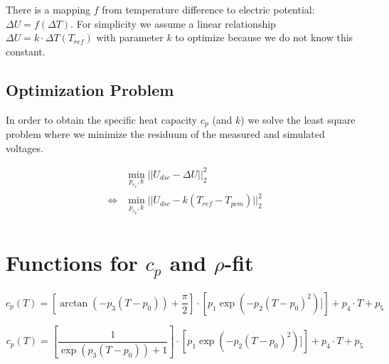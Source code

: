 \documentclass{scrartcl}[12pt, halfparskip]
\begin{document}
There is a mapping $f$ from temperature difference to electric potential: $\Delta U = f(\Delta T)$.
For simplicity we assume a linear relationship $\Delta U = k \cdot \Delta T(T_{ref})$ with parameter $k$ to optimize because we do not know this constant. \\

\subsection{Optimization Problem}

In order to obtain the specific heat capacity $c_p$ (and $k$) we solve the least square problem where we minimize the residuum of the measured and simulated voltages.

\begin{align*}
	& \min_{p_{c_p}, k} ||U_{dsc} - \Delta U ||_2^2 \\
	\Leftrightarrow & \min_{p_{c_p}, k} ||U_{dsc} - k (T_{ref} - T_{pcm}) ||_2^2 \\
\end{align*}

\section{Functions for $c_p$ and $\rho$-fit}

\begin{equation*}
	c_p(T) = \left[ \arctan (-p_3 (T-p_0)) + \frac{\pi}{2} \right] \cdot \left[ p_1 \exp(-p_2(T-p_0)^2)] \right] + p_4 \cdot T + p_5 
\end{equation*}


\begin{equation*}
	c_p(T) = \left[ \frac{1}{\exp(p_3(T-p_0)) + 1} \right] \cdot \left[ p_1 \exp(-p_2(T-p_0)^2)] \right] + p_4 \cdot T + p_5 
\end{equation*}
\end{document}
